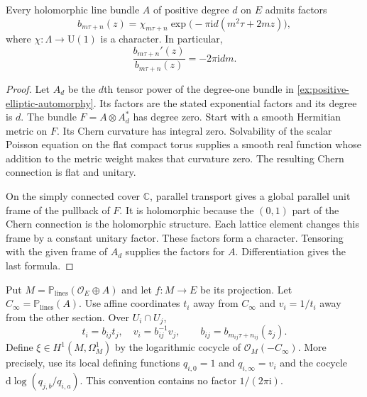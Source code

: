 \begin{lemma}\label{lem:elliptic-degree-automorphy-normalization}
Every holomorphic line bundle $A$ of positive degree $d$ on $E$ admits factors
\[
 b_{m\tau+n}(z)=\chi_{m\tau+n}
       \exp\bigl(-\pi\mathrm{i}d(m^2\tau+2mz)\bigr),
\]
where $\chi:\Lambda\to\mathrm U(1)$ is a character. In particular,
\[
 \frac{b_{m\tau+n}'(z)}{b_{m\tau+n}(z)}=-2\pi\mathrm{i}dm.
\]
\end{lemma}
\begin{proof}
Let $A_d$ be the $d$th tensor power of the degree-one bundle in \cref{ex:positive-elliptic-automorphy}. Its factors are the stated exponential factors and its degree is $d$. The bundle $F=A\otimes A_d^*$ has degree zero. Start with a smooth Hermitian metric on $F$. Its Chern curvature has integral zero. Solvability of the scalar Poisson equation on the flat compact torus supplies a smooth real function whose addition to the metric weight makes that curvature zero. The resulting Chern connection is flat and unitary.

On the simply connected cover $\mathbb C$, parallel transport gives a global parallel unit frame of the pullback of $F$. It is holomorphic because the $(0,1)$ part of the Chern connection is the holomorphic structure. Each lattice element changes this frame by a constant unitary factor. These factors form a character. Tensoring with the given frame of $A_d$ supplies the factors for $A$. Differentiation gives the last formula.
\end{proof}

Put $M=\mathbb P_{\mathrm{lines}}(\mathcal O_E\oplus A)$ and let $f:M\to E$ be its projection. Let $C_\infty=\mathbb P_{\mathrm{lines}}(A)$. Use affine coordinates $t_i$ away from $C_\infty$ and $v_i=1/t_i$ away from the other section. Over $U_i\cap U_j$,
\[
 t_i=b_{ij}t_j,\quad v_i=b_{ij}^{-1}v_j,
 \qquad b_{ij}=b_{m_{ij}\tau+n_{ij}}(z_j).
\]
Define $\xi\in H^1(M,\Omega_M^1)$ by the logarithmic cocycle of $\mathcal O_M(-C_\infty)$. More precisely, use its local defining functions $q_{i,0}=1$ and $q_{i,\infty}=v_i$ and the cocycle $\mathrm{d}\log(q_{j,b}/q_{i,a})$. This convention contains no factor $1/(2\pi\mathrm{i})$.

